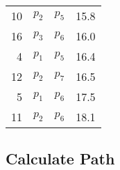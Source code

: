 \documentclass[
	final,
	a4paper,
	oneside,
	parskip=full,
	headings=standardclasses,
	headings=big,
	pointednumbers
]{scrartcl}
\begin{document}
\begin{minipage}[t]{.5\linewidth}
\begin{center}
\begin{tabular}[t]{|r|c|c|r|}
                \rowcolor[HTML]{999999} 10 & $p_{2}$ & $p_{5}$ & 15.8 \\
                \rowcolor[HTML]{999999} 16 & $p_{3}$ & $p_{6}$ & 16.0 \\
                \rowcolor[HTML]{999999} 4 & $p_{1}$ & $p_{5}$ & 16.4 \\
                \rowcolor[HTML]{999999} 12 & $p_{2}$ & $p_{7}$ & 16.5 \\
                \rowcolor[HTML]{999999} 5 & $p_{1}$ & $p_{6}$ & 17.5 \\
                \rowcolor[HTML]{999999} 11 & $p_{2}$ & $p_{6}$ & 18.1 \\
                \hline
            \end{tabular}
        \end{center}
    \end{minipage}

    \newpage


    \subsection*{Calculate Path}
\end{document}
